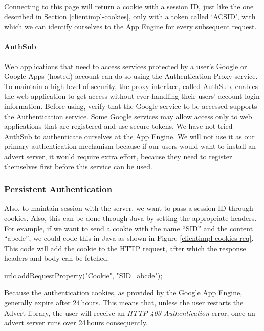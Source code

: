 Connecting to this page will return a cookie with a session ID, just like the
one described in Section \ref{clientimpl-cookies}, only with a token called
`ACSID', with which we can identify ourselves to the App Engine for every
subsequent request.

\paragraph{AuthSub}
Web applications that need to access services protected by a user's Google or
Google Apps (hosted) account can do so using the Authentication Proxy service. To
maintain a high level of security, the proxy interface, called AuthSub, enables
the web application to get access without ever handling their users' account
login information. Before using, verify that the Google service to be accessed
supports the Authentication service. Some Google services may allow access only
to web applications that are registered and use secure tokens. We have not tried
AuthSub to authenticate ourselves at the App Engine. We will not use it as our
primary authentication mechanism because if our users would want to install an
advert server, it would require extra effort, because they need to register
themselves first before this service can be used.

\subsubsection{Persistent Authentication}
Also, to maintain session with the server, we want to pass a session ID through
cookies. Also, this can be done through Java by setting the appropriate headers.
For example, if we want to send a cookie with the name ``SID'' and the content
``abcde'', we could code this in Java as shown in Figure
\ref{clientimpl-cookies-req}. This code will add the cookie to the HTTP request,
after which the response headers and body can be fetched.

\begin{figure*}[ht] %
\begin{center}
\begin{code}
urlc.addRequestProperty("Cookie", "SID=abcde");
\end{code}
\caption{Sending cookies in Java.\label{clientimpl-cookies-req}}
\end{center}
\end{figure*}

Because the authentication cookies, as provided by the Google App Engine,
generally expire after 24\,hours. This means that, unless the user restarts the
Advert library, the user will receive an \emph{HTTP 403 Authentication} error,
once an advert server runs over 24\,hours consequently. 

